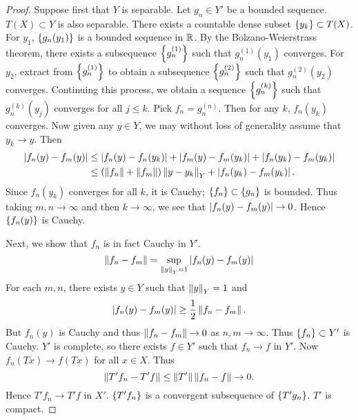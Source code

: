 \begin{proof}
    Suppose first that $Y$ is separable. Let $g_n\in Y'$ be a bounded 
    sequence. $T(X)\subset Y$ is also separable. There exists a countable 
    dense subset $\left\{ {y_k} \right\}\subset T(X)$. For $y_1$, $\left\{ {g_n(y_1)} \right\}$ 
    is a bounded sequence in $\mathbb{R}$. By the Bolzano-Weierstrass theorem, 
    there exists a subsequence $\left\{ {g^{(1)}_n} \right\}$ such that $g^{(1)}_n(y_1)$ 
    converges. For $y_2$, extract from $\left\{ {g^{(1)}_n} \right\}$ to obtain a 
    subsequence $\left\{ {g^{(2)}_n} \right\}$ such that $g^{(2)}_n(y_2)$ converges. 
    Continuing this process, we obtain a sequence $\left\{ {g^{(k)}_n} \right\}$ such that 
    $g^{(k)}_n(y_j)$ converges for all $j\leq k$. Pick $f_n = g^{(n)}_n$. 
    Then for any $k$, $f_n(y_k)$ converges. Now given any $y\in Y$, we 
    may without loss of generality assume that $y_k\to y$. Then 
    \begin{equation*}
        \begin{split}
            \left\lvert {f_n(y) - f_m(y)} \right\rvert &\leq \left\lvert {f_n(y) - f_n(y_k)} \right\rvert + \left\lvert {f_m(y) - f_m(y_k)} \right\rvert + \left\lvert {f_n(y_k) - f_m(y_k)} \right\rvert \\
            &\leq (\left\lVert {f_n} \right\rVert + \left\lVert {f_m} \right\rVert)\left\lVert {y - y_k} \right\rVert_Y + \left\lvert {f_n(y_k) - f_m(y_k)} \right\rvert.
        \end{split}
    \end{equation*}
    Since $f_n(y_k)$ converges for all $k$, it is Cauchy; 
    $\left\{ {f_n} \right\}\subset\left\{ {g_n} \right\}$ is bounded. Thus taking $m,n\to\infty$ 
    and then $k\to\infty$, we see that $\left\lvert {f_n(y) - f_m(y)} \right\rvert\to 0$. 
    Hence $\left\{ {f_n(y)} \right\}$ is Cauchy. 

    Next, we show that $f_n$ is in fact Cauchy in $Y'$. 
    \begin{equation*}
        \left\lVert {f_n - f_m} \right\rVert = \sup_{\left\lVert {y} \right\rVert_Y = 1} \left\lvert {f_n(y) - f_m(y)} \right\rvert 
    \end{equation*}
    For each $m,n$, there exists $y\in Y$ such that $\left\lVert {y} \right\rVert_Y = 1$ and 
    \begin{equation*}
        \left\lvert {f_n(y) - f_m(y)} \right\rvert \geq \frac{1}{2}\left\lVert {f_n - f_m} \right\rVert.
    \end{equation*}
    But $f_n(y)$ is Cauchy and thus $\left\lVert {f_n - f_m} \right\rVert\to 0$ as $n,m\to\infty$.
    Thus $\left\{ {f_n} \right\}\subset Y'$ is Cauchy. $Y'$ is complete, so there exists 
    $f\in Y'$ such that $f_n\to f$ in $Y'$. Now $f_n(Tx)\to f(Tx)$ for all 
    $x\in X$. Thus 
    \begin{equation*}
        \left\lVert {T'f_n - T'f} \right\rVert \leq \left\lVert {T'} \right\rVert\left\lVert {f_n - f} \right\rVert \to 0.
    \end{equation*}
    Hence $T'f_n\to T'f$ in $X'$. $\left\{ {T'f_n} \right\}$ is a convergent 
    subsequence of $\left\{ {T'g_n} \right\}$. $T'$ is compact. 


\end{proof}
